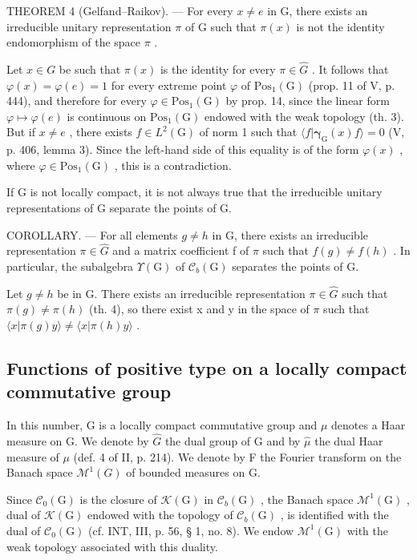 THEOREM 4 (Gelfand--Raikov). --- For every \(x \neq e\) in G, there exists an irreducible unitary representation \(\pi\) of G such that \(\pi(x)\) is not the identity endomorphism of the space \(\pi\) .

Let \(x \in G\) be such that \(\pi(x)\) is the identity for every \(\pi \in \widehat{G}\) . It follows that \(\varphi(x) = \varphi(e) = 1\) for every extreme point \(\varphi\) of \(\mathrm{Pos}_{1}(\mathrm{G})\) (prop. 11 of V, p. 444), and therefore for every \(\varphi \in \mathrm{Pos}_{1}(\mathrm{G})\) by prop. 14, since the linear form \(\varphi \mapsto \varphi(e)\) is continuous on \(\mathrm{Pos}_{1}(\mathrm{G})\) endowed with the weak topology (th. 3). But if \(x \neq e\) , there exists \(f \in L^{2}(\mathrm{G})\) of norm 1 such that \(\langle f | \boldsymbol{\gamma}_{\mathrm{G}}(x)f \rangle = 0\) (V, p. 406, lemma 3). Since the left-hand side of this equality is of the form \(\varphi(x)\) , where \(\varphi \in \mathrm{Pos}_{1}(\mathrm{G})\) , this is a contradiction.

If G is not locally compact, it is not always true that the irreducible unitary representations of G separate the points of G.

COROLLARY. --- For all elements \(g \neq h\) in G, there exists an irreducible representation \(\pi \in \widehat{G}\) and a matrix coefficient f of \(\pi\) such that \(f(g) \neq f(h)\) . In particular, the subalgebra \(\Upsilon(\mathrm{G})\) of \(\mathcal{C}_{b}(\mathrm{G})\) separates the points of G.

Let \(g \neq h\) be in G. There exists an irreducible representation \(\pi \in \widehat{G}\) such that \(\pi(g) \neq \pi(h)\) (th. 4), so there exist x and y in the space of \(\pi\) such that \(\langle x | \pi(g)y \rangle \neq \langle x | \pi(h)y \rangle\) .

\subsection{Functions of positive type on a locally compact commutative group}

In this number, G is a locally compact commutative group and \(\mu\) denotes a Haar measure on G. We denote by \(\widehat{G}\) the dual group of G and by \(\widehat{\mu}\) the dual Haar measure of \(\mu\) (def. 4 of II, p. 214). We denote by F the Fourier transform on the Banach space \(\mathcal{M}^{1}(G)\) of bounded measures on G.

Since \(\mathcal{C}_0(\mathrm{G})\) is the closure of \(\mathcal{K}(\mathrm{G})\) in \(\mathcal{C}_b(\mathrm{G})\) , the Banach space \(\mathcal{M}^1 (\mathrm{G})\) , dual of \(\mathcal{K}(\mathrm{G})\) endowed with the topology of \(\mathcal{C}_b(\mathrm{G})\) , is identified with the dual of \(\mathcal{C}_0(\mathrm{G})\) (cf. INT, III, p. 56, § 1, no. 8). We endow \(\mathcal{M}^1 (\mathrm{G})\) with the weak topology associated with this duality.

